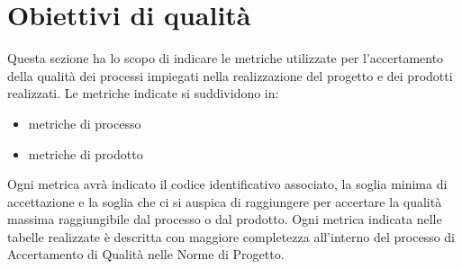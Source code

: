 \section{Obiettivi di qualità}
\label{sec:obiettivi_qualità}
Questa sezione ha lo scopo di indicare le metriche utilizzate per l'accertamento della qualità dei processi impiegati nella realizzazione
del progetto e dei prodotti realizzati.
Le metriche indicate si suddividono in:
\begin{itemize}
    \item metriche di processo
    \item metriche di prodotto
\end{itemize} 
Ogni metrica avrà indicato il codice identificativo associato, la soglia minima di accettazione e la soglia che ci si auspica di raggiungere 
per accertare la qualità massima raggiungibile dal processo o dal prodotto.
Ogni metrica indicata nelle tabelle realizzate è descritta con maggiore completezza all'interno del processo di Accertamento di Qualità nelle Norme di Progetto.







